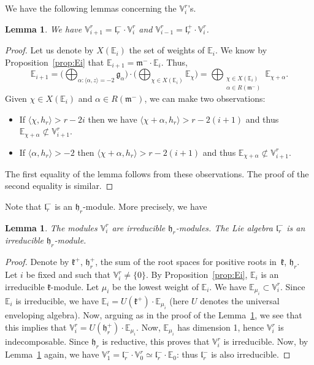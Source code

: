 \documentclass[JEP,XML,SOM,Unicode,NoFloatCountersInSection]{cedram}
\theoremstyle{plain}
\newtheorem{lemm}[theo]{Lemma}
\theoremstyle{definition}
\let\rgy r
\newcommand{\bE}{\mathbb{E}}
\newcommand{\Vr}{\mathbb{V}^\rgy}
\newcommand{\fgg}{\mathfrak{g}}
\newcommand{\fh}{\mathfrak{h}}
\newcommand{\fk}{\mathfrak{k}}
\newcommand{\fl}{\mathfrak{l}}
\newcommand{\fm}{\mathfrak{m}}
\newcommand{\scal}[1]{\langle #1 \rangle}
\begin{document}
We have the following lemmas concerning the $\Vr_i$'s.
\begin{lemm}
\label{lemm:Viplus1}
We have $\Vr_{i+1} = \fl_\rgy^- \cdot \Vr_i$ and $\Vr_{i-1} = \fl_\rgy^+ \cdot \Vr_i$.
\end{lemm}
\begin{proof}
Let us denote by $X(\bE_i)$ the set of weights
of $\bE_i$. We know by Proposition~\ref{prop:Ei} that $\bE_{i+1} = \fm^-\cdot \bE_i$. Thus,
$$
\bE_{i+1} = \biggl (\bigoplus_{\alpha:\scal{\alpha,z} = -2} \fgg_\alpha \biggr) \cdot
\biggl (\bigoplus_{\chi \in X(\bE_i)} \bE_\chi \biggr) =
\bigoplus_{\substack{\chi \in X(\bE_i)\\ \alpha \in R(\fm^-)}} \bE_{\chi+\alpha} .
$$
Given $\chi \in X(\bE_i)$ and $\alpha \in R(\fm^-)$, we can make two observations:
\begin{itemize}
\item If $\scal{\chi,h_\rgy} > r - 2i$ then we have $\scal{\chi+\alpha,h_\rgy} > \rgy -2(i+1)$ and thus
$\bE_{\chi + \alpha} \not \subset \Vr_{i+1}$.
\item If $\scal{\alpha,h_\rgy} > -2$ then $\scal{\chi+\alpha,h_\rgy} > \rgy -2(i+1)$ and thus
$\bE_{\chi + \alpha} \not \subset \Vr_{i+1}$.
\end{itemize}
The first equality of the lemma follows from these observations.
The proof of the second equality is similar.
\end{proof}

Note that $\fl_\rgy^-$ is an $\fh_\rgy$-module. More precisely, we have

\begin{lemm}
\label{lemm:Vi-irr}
The modules $\Vr_i$ are irreducible $\fh_\rgy$-modules.
The Lie algebra $\fl_\rgy^-$ is an irreducible $\fh_\rgy$-module.
\end{lemm}
\begin{proof}
Denote by $\fk^+$, \resp $\fh_\rgy^+$, the sum of the root spaces for positive roots in~$\fk$, \resp $\fh_\rgy$.
Let $i$ be fixed and such that $\Vr_i \neq \{0\}$. By Proposition~\ref{prop:Ei}, $\bE_i$ is an
irreducible $\fk$-module.
Let $\mu_i$ be the lowest weight of $\bE_i$. We have $\bE_{\mu_i} \subset \Vr_i$.
Since $\bE_i$ is irreducible, we have $\bE_i = U(\fk^+) \cdot \bE_{\mu_i}$ (here $U$ denotes the
universal enveloping algebra). Now, arguing as in the proof
of the Lemma~\ref{lemm:Viplus1}, we see that this implies that $\Vr_i = U(\fh_\rgy^+) \cdot
\bE_{\mu_i}$. Now, $\bE_{\mu_i}$ has dimension 1, hence $\Vr_i$ is indecomposable. Since $\fh_\rgy$ is reductive, this proves that $\Vr_i$ is irreducible.
Now, by Lemma~\ref{lemm:Viplus1} again, we have $\Vr_1 = \fl_\rgy^- \cdot \Vr_0 \simeq \fl_\rgy^- \cdot \bE_0$: thus
$\fl_\rgy^-$ is also irreducible.
\end{proof}
\end{document}
